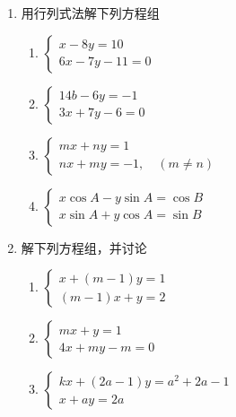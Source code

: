 \begin{ex}
\begin{enumerate}
    \item 用行列式法解下列方程组
\begin{enumerate}
    \item $\begin{cases}
        x-8y=10\\6x-7y-11=0
    \end{cases}$
    \item $\begin{cases}
        14b-6y=-1\\ 3x+7y-6=0   
    \end{cases}$
    \item $\begin{cases}
        mx+ny=1\\nx+my=-1,\quad  (m\ne n) 
    \end{cases}$
    \item $\begin{cases}
        x\cos A-y\sin A=\cos B\\ x\sin A+y\cos A=\sin B
    \end{cases}$
\end{enumerate}

    \item 解下列方程组，并讨论
\begin{enumerate}
    \item $\begin{cases}
        x+ (m-1)y=1\\(m-1) x+y=2
    \end{cases}$
    \item $\begin{cases}
        mx+y=1\\ 4x+my-m=0
    \end{cases}$
    \item $\begin{cases}
        kx+ (2a-1) y=a^2+2a-1\\ x+ay=2a
    \end{cases}$
\end{enumerate}
\end{enumerate}   
\end{ex}

